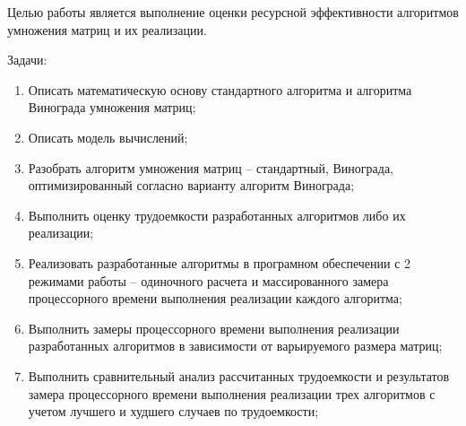 
Целью работы является выполнение оценки ресурсной эффективности алгоритмов умножения матриц и их реализации.

Задачи:
\begin{enumerate}[label={\arabic*)}]
	\item Описать математическую основу стандартного алгоритма и алгоритма Винограда умножения матриц;
	\item Описать модель вычислений;
	\item Разобрать алгоритм умножения матриц -- стандартный, Винограда, оптимизированный согласно варианту алгоритм Винограда;
	\item Выполнить оценку трудоемкости разработанных алгоритмов либо их реализации;
	\item Реализовать разработанные алгоритмы в програмном обеспечении с 2 режимами работы -- одиночного расчета и массированного замера процессорного времени выполнения реализации каждого алгоритма;
	\item Выполнить замеры процессорного времени выполнения реализации разработанных алгоритмов в зависимости от варьируемого размера матриц;
	\item Выполнить сравнительный анализ рассчитанных трудоемкости и результатов замера процессорного времени выполнения реализации трех алгоритмов с учетом лучшего и худшего случаев по трудоемкости;
\end{enumerate}

\clearpage

